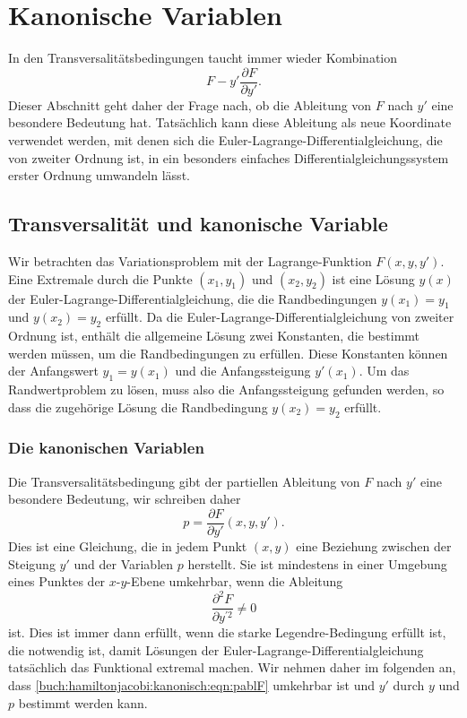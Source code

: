 %
%
%
\section{Kanonische Variablen
\label{buch:hamiltonjacobi:section:kanonisch}}
In den Transversalitätsbedingungen taucht immer wieder Kombination
\[
F - y'\frac{\partial F}{\partial y'}.
\]
Dieser Abschnitt geht daher der Frage nach, ob die Ableitung von
$F$ nach $y'$ eine besondere Bedeutung hat.
Tatsächlich kann diese Ableitung als neue Koordinate verwendet
werden, mit denen sich die Euler-Lagrange-Differentialgleichung, die
von zweiter Ordnung ist, in ein besonders einfaches
Differentialgleichungssystem erster Ordnung umwandeln lässt.

%
%
\subsection{Transversalität und kanonische Variable}
Wir betrachten das Variationsproblem mit der Lagrange-Funktion
$F(x,y,y')$.
Eine Extremale durch die Punkte $(x_1,y_1)$ und $(x_2,y_2)$ ist
eine Lösung $y(x)$ der Euler-Lagrange-Differentialgleichung, die die
Randbedingungen $y(x_1)=y_1$ und $y(x_2)=y_2$ erfüllt.
Da die Euler-Lagrange-Differentialgleichung von zweiter Ordnung ist,
enthält die allgemeine Lösung zwei Konstanten, die bestimmt werden 
müssen, um die Randbedingungen zu erfüllen.
Diese Konstanten können der Anfangswert $y_1=y(x_1)$ und die Anfangssteigung
$y'(x_1)$.
Um das Randwertproblem zu lösen, muss also die Anfangssteigung gefunden
werden, so dass die zugehörige Lösung die Randbedingung $y(x_2)=y_2$ 
erfüllt.

%
%
\subsubsection{Die kanonischen Variablen}
Die Transversalitätsbedingung gibt der partiellen Ableitung von $F$
nach $y'$ eine besondere Bedeutung, wir schreiben daher 
\begin{equation}
p = \frac{\partial F}{\partial y'}(x,y,y').
\label{buch:hamiltonjacobi:kanonisch:eqn:pablF}
\end{equation}
Dies ist eine Gleichung, die in jedem Punkt $(x,y)$ eine Beziehung 
zwischen der Steigung $y'$ und der Variablen $p$ herstellt.
Sie ist mindestens in einer Umgebung eines Punktes der $x$-$y$-Ebene
umkehrbar, wenn die Ableitung
\[
\frac{\partial^2 F}{\partial y^{\prime 2}}
\ne 0
\]
ist.
Dies ist immer dann erfüllt, wenn die starke Legendre-Bedingung
erfüllt ist, die notwendig ist, damit Lösungen der
Euler-Lagrange-Differentialgleichung tatsächlich das Funktional
extremal machen.
Wir nehmen daher im folgenden an, dass 
\eqref{buch:hamiltonjacobi:kanonisch:eqn:pablF}
umkehrbar ist und $y'$ durch $y$ und $p$ bestimmt werden kann.

